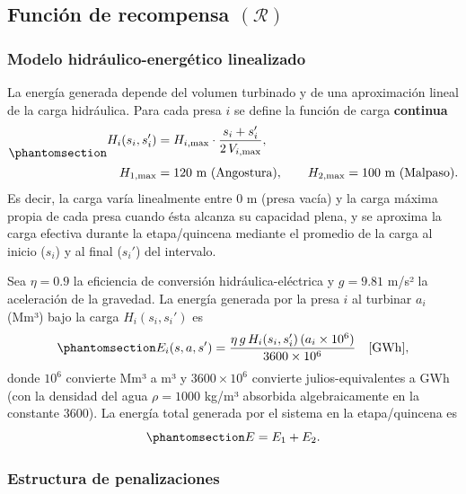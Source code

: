 \documentclass[
  letterpaper,
  DIV=11,
  numbers=noendperiod]{scrreprt}
\theoremstyle{definition}
\theoremstyle{remark}
\begin{document}
\subsection{\texorpdfstring{Función de recompensa
\((\mathcal{R})\)}{Función de recompensa (\textbackslash mathcal\{R\})}}\label{sec-recompensa}

\subsubsection{Modelo hidráulico-energético
linealizado}\label{modelo-hidruxe1ulico-energuxe9tico-linealizado-1}

La energía generada depende del volumen turbinado y de una aproximación
lineal de la carga hidráulica. Para cada presa \(i\) se define la
función de carga \textbf{continua}
\begin{equation}\protect\phantomsection\label{eq-altura}{
\begin{aligned}
H_i(s_i,s_i')
&= H_{i,\max}\cdot
\frac{s_i+s_i'}{2\,V_{i,\max}}, \\[4pt]
H_{1,\max} &= 120\ \text{m (Angostura)}, \qquad
H_{2,\max} = 100\ \text{m (Malpaso)}.
\end{aligned}
}\end{equation} Es decir, la carga varía linealmente entre \(0\) m
(presa vacía) y la carga máxima propia de cada presa cuando ésta alcanza
su capacidad plena, y se aproxima la carga efectiva durante la
etapa/quincena mediante el promedio de la carga al inicio (\(s_i\)) y al
final (\(s_i'\)) del intervalo.

Sea \(\eta = 0.9\) la eficiencia de conversión hidráulica-eléctrica y
\(g = 9.81\) m/s² la aceleración de la gravedad. La energía generada por
la presa \(i\) al turbinar \(a_i\) (Mm³) bajo la carga \(H_i(s_i,s_i')\)
es \begin{equation}\protect\phantomsection\label{eq-energia}{
E_i(s,a,s') = \frac{\eta\, g\, H_i(s_i,s_i')\,(a_i\times 10^6)}{3600\times 10^6} \quad [\text{GWh}],
}\end{equation} donde \(10^6\) convierte Mm³ a m³ y \(3600\times10^6\)
convierte julios-equivalentes a GWh (con la densidad del agua
\(\rho=1000\) kg/m³ absorbida algebraicamente en la constante \(3600\)).
La energía total generada por el sistema en la etapa/quincena es
\begin{equation}\protect\phantomsection\label{eq-energia-total}{
E = E_1+E_2.
}\end{equation}

\subsubsection{Estructura de
penalizaciones}\label{estructura-de-penalizaciones-1}
\end{document}
